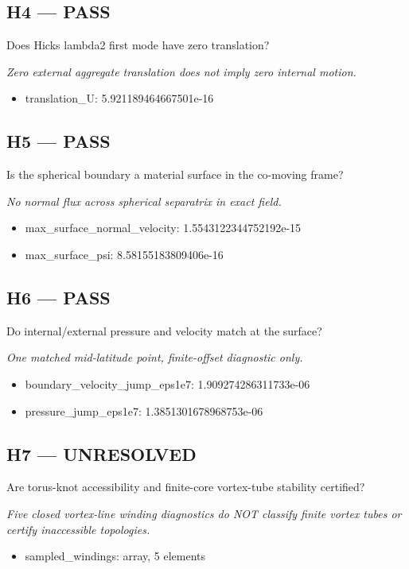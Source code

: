 \documentclass[10pt,a4paper]{article}
\begin{document}
\subsection*{H4 --- PASS}
Does Hicks lambda2 first mode have zero translation?
\par\textit{Zero external aggregate translation does not imply zero internal motion.}\par
\begin{itemize}
\item translation\_U: 5.921189464667501e-16
\end{itemize}
\subsection*{H5 --- PASS}
Is the spherical boundary a material surface in the co-moving frame?
\par\textit{No normal flux across spherical separatrix in exact field.}\par
\begin{itemize}
\item max\_surface\_normal\_velocity: 1.5543122344752192e-15
\item max\_surface\_psi: 8.58155183809406e-16
\end{itemize}
\subsection*{H6 --- PASS}
Do internal/external pressure and velocity match at the surface?
\par\textit{One matched mid-latitude point, finite-offset diagnostic only.}\par
\begin{itemize}
\item boundary\_velocity\_jump\_eps1e7: 1.909274286311733e-06
\item pressure\_jump\_eps1e7: 1.3851301678968753e-06
\end{itemize}
\subsection*{H7 --- UNRESOLVED}
Are torus-knot accessibility and finite-core vortex-tube stability certified?
\par\textit{Five closed vortex-line winding diagnostics do NOT classify finite vortex tubes or certify inaccessible topologies.}\par
\begin{itemize}
\item sampled\_windings: array, 5 elements
\end{itemize}
\end{document}
